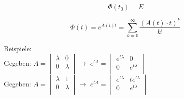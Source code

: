 \begin{equation*}
\Phi(t_0) = E
\end{equation*}

\begin{equation*}
\Phi(t) = e^{A(t)t} =\sum_{k=0}^{\infty}\frac{(A(t)\cdot t)^k}{k!}
\end{equation*}

Beispiele:\\
Gegeben: $A = 	\begin{vmatrix} 
	        		\lambda & 0\\ 
	        		0 & \lambda\\   
				\end{vmatrix} 
				\rightarrow$ 
$e^{tA} = \begin{vmatrix} 
	        		e^{t\lambda} & 0\\ 
	        		0 & e^{t\lambda}\\   
				\end{vmatrix}$\\
Gegeben: $A = 	\begin{vmatrix} 
	        		\lambda & 1\\ 
	        		0 & \lambda\\   
				\end{vmatrix} 
				\rightarrow$ 
$e^{tA} = \begin{vmatrix} 
	        		e^{t\lambda} & te^{t\lambda}\\ 
	        		0 & e^{t\lambda}\\   
				\end{vmatrix}$\\


